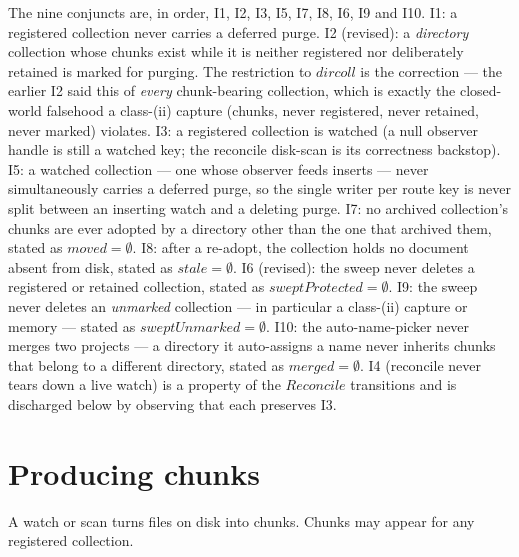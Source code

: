 \documentclass[a4paper]{article}
\begin{document}
The nine conjuncts are, in order, I1, I2, I3, I5, I7, I8, I6, I9 and I10.  I1: a
registered collection never carries a deferred purge.  I2 (revised): a
\textit{directory} collection whose chunks exist while it is neither registered
nor deliberately retained is marked for purging.  The restriction to $dircoll$ is
the correction --- the earlier I2 said this of \textit{every} chunk-bearing
collection, which is exactly the closed-world falsehood a class-(ii) capture
(chunks, never registered, never retained, never marked) violates.  I3: a
registered collection is watched (a null observer handle is still a watched key;
the reconcile disk-scan is its correctness backstop).  I5: a watched collection
--- one whose observer feeds inserts --- never simultaneously carries a deferred
purge, so the single writer per route key is never split between an inserting
watch and a deleting purge.  I7: no archived collection's chunks are ever adopted
by a directory other than the one that archived them, stated as $moved =
\emptyset$.  I8: after a re-adopt, the collection holds no document absent from
disk, stated as $stale = \emptyset$.  I6 (revised): the sweep never deletes a
registered or retained collection, stated as $sweptProtected = \emptyset$.  I9:
the sweep never deletes an \textit{unmarked} collection --- in particular a
class-(ii) capture or memory --- stated as $sweptUnmarked = \emptyset$.  I10: the
auto-name-picker never merges two projects --- a directory it auto-assigns a name
never inherits chunks that belong to a different directory, stated as $merged =
\emptyset$.  I4 (reconcile never tears down a live watch) is a property of the
$Reconcile$ transitions and is discharged below by observing that each preserves
I3.

\section{Producing chunks}

A watch or scan turns files on disk into chunks.  Chunks may appear for any
registered collection.
\end{document}
